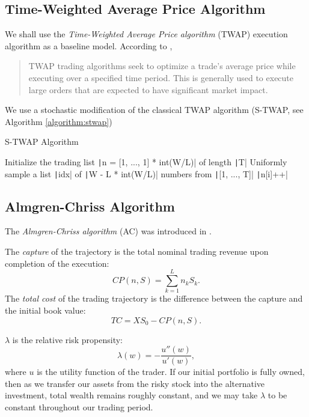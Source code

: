     \subsection{Time-Weighted Average Price Algorithm}
        We shall use the \emph{Time-Weighted Average Price algorithm} (TWAP) execution algorithm as a baseline model.
        According to \cite{TWAP}, 
        \begin{quote}
            TWAP trading algorithms seek to optimize a trade's average price while executing over a specified time period. This is 
            generally used to execute large orders that are expected to have significant market impact.
        \end{quote}
        We use a stochastic modification of the classical TWAP algorithm (S-TWAP, see Algorithm \ref{algorithm:stwap})
        \begin{algorithm}
            \caption{S-TWAP Algorithm}
            \begin{algorithmic}
                \State Initialize the trading list \texttt|n = [1, ..., 1] * int(W/L)| of length \texttt|T|
                \State Uniformly sample a list \texttt|idx| of \texttt|W - L * int(W/L)| numbers from \texttt|[1, ..., T]|
                    \State \texttt|n[i]++|
                \EndFor
            \end{algorithmic}
            \label{algorithm:stwap}
        \end{algorithm}

    \subsection{Almgren-Chriss Algorithm}
        The \emph{Almgren-Chriss algorithm} (AC) was introduced in \cite{Almgren2000}.

        \begin{definition}
            The \emph{capture} of the trajectory is the total nominal trading revenue upon completion of the execution:
            \begin{equation*}
                CP(n, S) = \sum_{k=1}^{L} n_kS_k.
            \end{equation*}
            The \emph{total cost} of the trading trajectory is the difference between the capture and the initial book value:
            \begin{equation*}
                TC = XS_0 - CP(n, S).
            \end{equation*}
        \end{definition}
        \noindent$\lambda$ is the relative risk propensity:
        \begin{equation*}
            \lambda(w) = -\frac{u''(w)}{u'(w)},
        \end{equation*}
        where $u$ is the utility function of the trader. If our initial portfolio is fully owned, then as we transfer our assets from the 
        risky stock into the alternative investment, total wealth remains roughly constant, and we may take $\lambda$ to be constant throughout our trading period.
        
